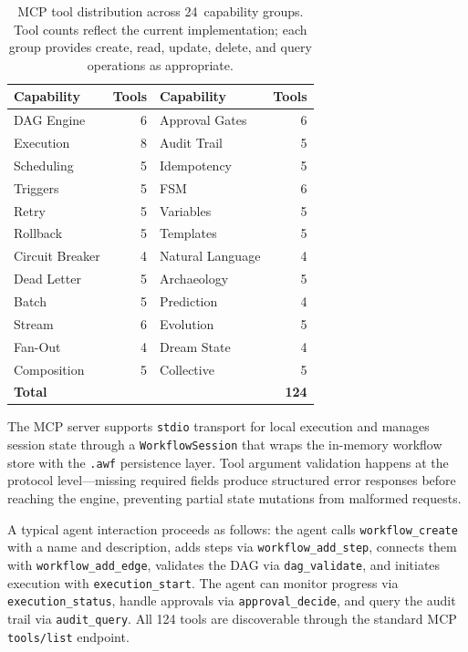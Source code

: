 \documentclass[10pt, twocolumn]{article}
\begin{document}
\begin{table}[t]
\caption{MCP tool distribution across 24~capability groups. Tool counts reflect the current implementation; each group provides create, read, update, delete, and query operations as appropriate.}
\label{tab:tools}
\centering\scriptsize
\begin{tabular}{@{}lr|lr@{}}
\toprule
\textbf{Capability} & \textbf{Tools} & \textbf{Capability} & \textbf{Tools} \\
\midrule
DAG Engine      & 6 & Approval Gates    & 6 \\
Execution       & 8 & Audit Trail       & 5 \\
Scheduling      & 5 & Idempotency       & 5 \\
Triggers        & 5 & FSM               & 6 \\
Retry           & 5 & Variables         & 5 \\
Rollback        & 5 & Templates         & 5 \\
Circuit Breaker & 4 & Natural Language   & 4 \\
Dead Letter     & 5 & Archaeology       & 5 \\
Batch           & 5 & Prediction        & 4 \\
Stream          & 6 & Evolution         & 5 \\
Fan-Out         & 4 & Dream State       & 4 \\
Composition     & 5 & Collective        & 5 \\
\midrule
\multicolumn{2}{l}{\textbf{Total}} & \multicolumn{2}{r}{\textbf{124}} \\
\bottomrule
\end{tabular}
\end{table}

The MCP server supports \texttt{stdio} transport for local execution and manages session state through a \texttt{WorkflowSession} that wraps the in-memory workflow store with the \texttt{.awf} persistence layer. Tool argument validation happens at the protocol level---missing required fields produce structured error responses before reaching the engine, preventing partial state mutations from malformed requests.

A typical agent interaction proceeds as follows: the agent calls \texttt{workflow\_create} with a name and description, adds steps via \texttt{workflow\_add\_step}, connects them with \texttt{workflow\_add\_edge}, validates the DAG via \texttt{dag\_validate}, and initiates execution with \texttt{execution\_start}. The agent can monitor progress via \texttt{execution\_status}, handle approvals via \texttt{approval\_decide}, and query the audit trail via \texttt{audit\_query}. All 124 tools are discoverable through the standard MCP \texttt{tools/list} endpoint.
\end{document}
